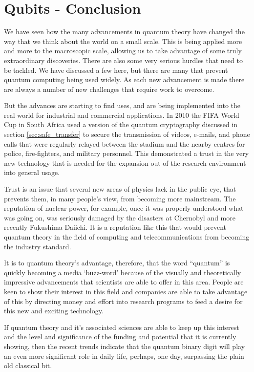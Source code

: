 
\section{Qubits - Conclusion}
We have seen how the many advancements in quantum theory have changed the way that we think about the world on a small scale. This is being applied more and more to the macroscopic scale, allowing us to take advantage of some truly extraordinary discoveries. There are also some very serious hurdles that need to be tackled. We have discussed a few here, but there are many that prevent quantum computing being used widely. As each new advancement is made there are always a number of new challenges that require work to overcome.

But the advances are starting to find uses, and are being implemented into the real world for industrial and commercial applications. In 2010 the FIFA World Cup in South Africa used a version of the quantum cryptography discussed in section \ref{sec:safe_transfer} to secure the transmission of videos, e-mails, and phone calls that were regularly relayed between the stadium and the nearby centres for police, fire-fighters, and military personnel. This demonstrated a trust in the very new technology that is needed for the expansion out of the research environment into general usage.

Trust is an issue that several new areas of physics lack in the public eye, that prevents them, in many people's view, from becoming more mainstream. The reputation of nuclear power, for example, once it was properly understood what was going on, was seriously damaged by the disasters at Chernobyl and more recently Fukushima Daiichi. It is a reputation like this that would prevent quantum theory in the field of computing and telecommunications from becoming the industry standard.

It is to quantum theory's advantage, therefore, that the word ``quantum'' is quickly becoming a media `buzz-word' because of the visually and theoretically impressive advancements that scientists are able to offer in this area. People are keen to show their interest in this field and companies are able to take advantage of this by directing money and effort into research programs to feed a desire for this new and exciting technology.

If quantum theory and it's associated sciences are able to keep up this interest and the level and significance of the funding and potential that it is currently showing, then the recent trends indicate that the quantum binary digit will play an even more significant role in daily life, perhaps, one day, surpassing the plain old classical bit.
